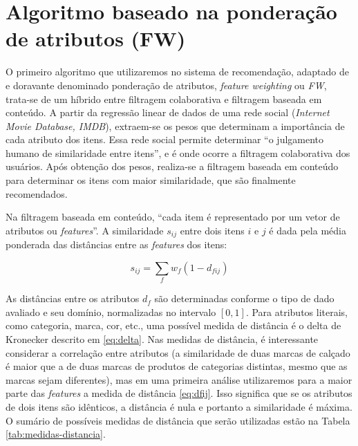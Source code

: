 \section{Algoritmo baseado na ponderação de atributos (FW)} %
\label{sec:algoritmo_baseado_na_pondera_o_de_atributos_}


O primeiro algoritmo que utilizaremos no sistema de recomendação, adaptado de  \cite{symeonidis2007feature} e doravante denominado ponderação de atributos, \textit{feature weighting} ou \textit{FW}, trata-se de um híbrido entre filtragem colaborativa e filtragem baseada em conteúdo. A partir da regressão linear de dados de uma rede social (\textit{Internet Movie Database, IMDB}), extraem-se os pesos que determinam a importância de cada atributo dos itens. Essa rede social permite determinar ``o julgamento humano de similaridade entre itens'', e é onde ocorre a filtragem colaborativa dos usuários. Após obtenção dos pesos, realiza-se a filtragem baseada em conteúdo para determinar os itens com maior similaridade, que são finalmente recomendados.

Na filtragem baseada em conteúdo, ``cada item é representado por um vetor de atributos ou \textit{features}''. A similaridade $s_{ij}$ entre dois itens $i$ e $j$ é dada pela média ponderada das distâncias entre as \textit{features} dos itens:

\begin{equation} 
\label{eq:sij}
    s_{ij} = \sum_{f}{w_{f} \left(1-d_{fij}\right)}
\end{equation}

As distâncias entre os atributos $d_f$ são determinadas conforme o tipo de dado avaliado e seu domínio, normalizadas no intervalo $\left[0,1\right]$. Para atributos literais, como categoria, marca, cor, etc., uma possível medida de distância é o delta de Kronecker descrito em \ref{eq:delta}. Nas medidas de distância, é interessante considerar a correlação entre atributos (a similaridade de duas marcas de calçado é maior que a de duas marcas de produtos de categorias distintas, mesmo que as marcas sejam diferentes), mas em uma primeira análise utilizaremos para a maior parte das \textit{features} a medida de distância \ref{eq:dfij}. Isso significa que se os atributos de dois itens são idênticos, a distância é nula e portanto a similaridade é máxima. O sumário de possíveis medidas de distância que serão utilizadas estão na Tabela \ref{tab:medidas-distancia}.

